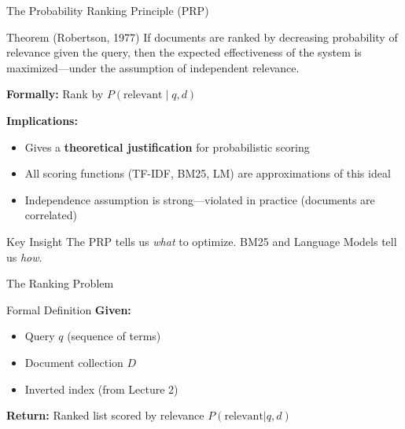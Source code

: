 \documentclass[aspectratio=169]{beamer}
\newif\ifanimated
\newcommand{\cpause}{\ifanimated\pause\fi}
\begin{document}
\begin{frame}[shrink=10]{The Probability Ranking Principle (PRP)}
\begin{block}{Theorem (Robertson, 1977)}
If documents are ranked by decreasing probability of relevance given the query, then the expected effectiveness of the system is maximized---under the assumption of independent relevance.
\end{block}
\cpause
\vspace{1em}

\textbf{Formally:} Rank by $P(\text{relevant} \mid q, d)$

\vspace{1em}

\textbf{Implications:}
\begin{itemize}
    \item Gives a \textbf{theoretical justification} for probabilistic scoring
    \item All scoring functions (TF-IDF, BM25, LM) are approximations of this ideal
    \item Independence assumption is strong---violated in practice (documents are correlated)
\end{itemize}
\cpause

\vspace{0.5em}

\begin{exampleblock}{Key Insight}
The PRP tells us \emph{what} to optimize. BM25 and Language Models tell us \emph{how}.
\end{exampleblock}
\end{frame}

\begin{frame}[shrink=5]{The Ranking Problem}
\begin{block}{Formal Definition}
\textbf{Given:}
\begin{itemize}
    \item Query $q$ (sequence of terms)
    \item Document collection $D$
    \item Inverted index (from Lecture 2)
\end{itemize}

\vspace{0.5em}
\textbf{Return:} Ranked list scored by relevance $P(\text{relevant}|q,d)$
\end{block}
\cpause
\vspace{1em}

\end{frame}
\end{document}
